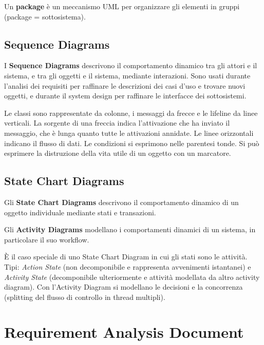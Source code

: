 \documentclass{article}
\begin{document}
        \vspace{3mm}
        
        Un \textbf{package} è un meccanismo UML per organizzare gli elementi in gruppi (package = sottosistema). 

    \subsection{Sequence Diagrams}

        I \textbf{Sequence Diagrams} descrivono il comportamento dinamico tra gli attori e il sistema, e tra gli oggetti e il sistema, mediante interazioni. Sono usati durante l’analisi dei requisiti per raffinare le descrizioni dei casi d’uso e trovare nuovi oggetti, e durante il system design per raffinare le interfacce dei sottosistemi. 
        
        Le classi sono rappresentate da colonne, i messaggi da frecce e le lifeline da linee verticali. La sorgente di una freccia indica l’attivazione che ha inviato il messaggio, che è lunga quanto tutte le attivazioni annidate. Le linee orizzontali indicano il flusso di dati. Le condizioni si esprimono nelle parentesi tonde. Si può esprimere la distruzione della vita utile di un oggetto con un marcatore.
    
    \subsection{State Chart Diagrams}

        Gli \textbf{State Chart Diagrams} descrivono il comportamento dinamico di un oggetto individuale mediante stati e transazioni.
        
        \vspace{3mm}
        
        Gli \textbf{Activity Diagrams} modellano i comportamenti dinamici di un sistema, in particolare il suo workflow.
        
        È il caso speciale di uno State Chart Diagram in cui gli stati sono le attività. Tipi: \textit{Action State} (non decomponibile e rappresenta avvenimenti istantanei) e \textit{Activity State} (decomponibile ulteriormente e attività modellata da altro activity diagram). Con l’Activity Diagram si modellano le decisioni e la concorrenza (splitting del flusso di controllo in thread multipli).

\section{Requirement Analysis Document}
\end{document}
